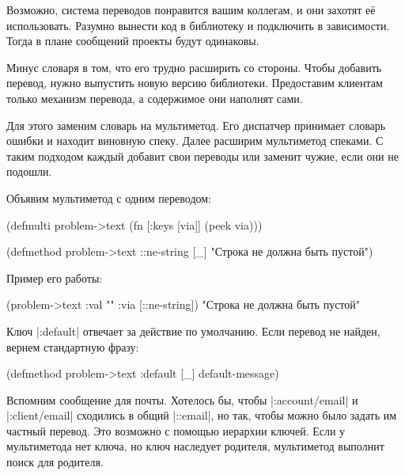 Возможно, система переводов понравится вашим коллегам, и они захотят е\"{е}
использовать. Разумно вынести код в библиотеку и подключить в зависимости. Тогда
в плане сообщений проекты будут одинаковы.

Минус словаря в том, что его трудно расширить со стороны. Чтобы добавить
перевод, нужно выпустить новую версию библиотеки. Предоставим клиентам только
механизм перевода, а содержимое они наполнят сами.

Для этого заменим словарь на мультиметод. Его диспатчер принимает словарь ошибки
и находит виновную спеку. Далее расширим мультиметод спеками. С таким подходом
каждый добавит свои переводы или заменит чужие, если они не подошли.

Объявим мультиметод с одним переводом:


  \begin{clojure}
(defmulti problem->text
  (fn [{:keys [via]}]
    (peek via)))

(defmethod problem->text ::ne-string [_]
  "Строка не должна быть пустой")
  \end{clojure}

Пример его работы:

  \begin{clojure}
(problem->text {:val "" :via [::ne-string]})
"Строка не должна быть пустой"
  \end{clojure}

Ключ \spverb|:default| отвечает за действие по умолчанию. Если перевод не
найден, вернем стандартную фразу:

\begin{english}
  \begin{clojure}
(defmethod problem->text :default [_]
  default-message)
  \end{clojure}
\end{english}


Вспомним сообщение для почты. Хотелось бы, чтобы \spverb|:account/email| и
\spverb|:client/email| сходились в общий \spverb|::email|, но так, чтобы можно
было задать им частный перевод. Это возможно с помощью иерархии ключей. Если у
мультиметода нет ключа, но ключ наследует родителя, мультиметод выполнит поиск
для родителя.

